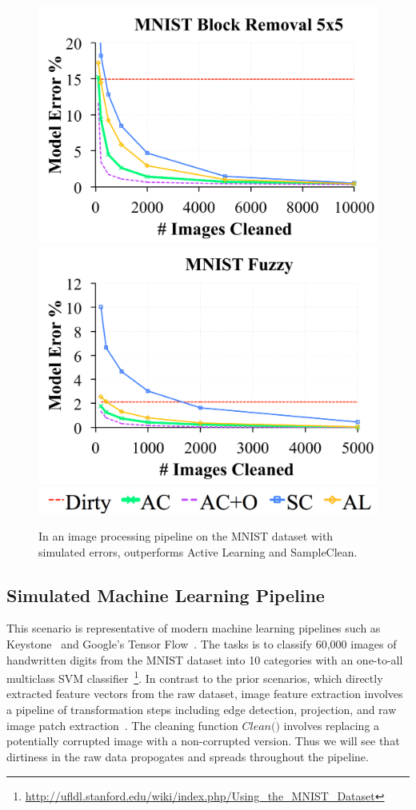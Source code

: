 \begin{figure}[t]
\centering
 \includegraphics[width=0.49\columnwidth]{exp/exp7a.pdf}
 \includegraphics[width=0.49\columnwidth]{exp/exp7b.pdf}
 \includegraphics[width=0.49\columnwidth]{exp/legend-general.png}\vspace{-0.5em}
 \caption{In an image processing pipeline on the MNIST dataset with simulated errors, \sys outperforms Active Learning and SampleClean.  \label{mnist}}\vspace{-1em}
\end{figure}

\subsection{Simulated Machine Learning Pipeline}
This scenario is representative of modern machine learning pipelines such as Keystone~\cite{keystone} and Google's Tensor Flow~\cite{tensor}. 
The tasks is to classify 60,000 images of handwritten digits from the MNIST dataset into 10 categories with an one-to-all multiclass SVM classifier~\footnote{\scriptsize\url{http://ufldl.stanford.edu/wiki/index.php/Using_the_MNIST_Dataset}}. 
In contrast to the prior scenarios, which directly extracted feature vectors from the raw dataset, image feature extraction involves a pipeline of transformation steps including edge detection, projection, and raw image patch extraction~\cite{keystone,tensor}.
The cleaning function $Clean(\dot)$ involves replacing a potentially corrupted image with a non-corrupted version.
Thus we will see that dirtiness in the raw data propogates and spreads throughout the pipeline.

